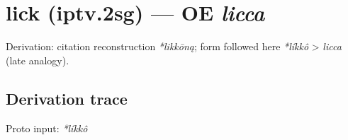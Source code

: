 \documentclass[
  british,
  a4paper,
  openany]{book}
\providecommand{\texorpdfstring}[2]{#1}
\begin{document}
\section{\texorpdfstring{lick (iptv.2sg) --- OE
\emph{licca}}{lick (iptv.2sg) --- OE licca}}\label{lick-iptv.2sg-oe-licca}


Derivation: citation reconstruction \emph{*likkōną}; form followed here
\emph{*líkkô} \textgreater{} \emph{licca} (late analogy).

\subsection{Derivation trace}\label{derivation-trace-132}

Proto input: \emph{*líkkô}

\begingroup
\setlength{\fboxsep}{6pt}
\end{document}
